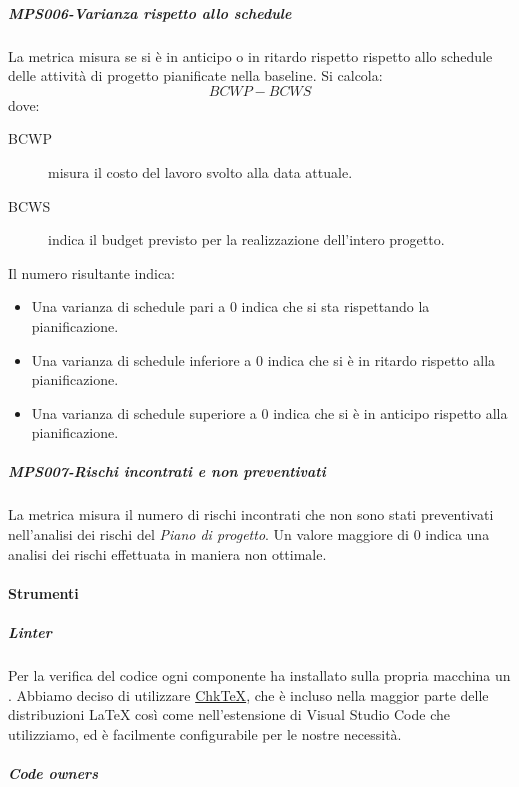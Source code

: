\documentclass[../norme-di-progetto.tex]{subfiles}
\begin{document}
\subparagraph{MPS006-Varianza rispetto allo schedule}%
\label{subp:MPS006-varianza_rispetto_allo_schedule}

La metrica misura se si è in anticipo o in ritardo rispetto rispetto allo schedule delle attività di progetto pianificate nella baseline. Si calcola:
\[
    BCWP - BCWS
\]
dove:
\begin{description}
  \item [BCWP] misura il costo del lavoro svolto alla data attuale.
  \item [BCWS] indica il budget previsto per la realizzazione dell'intero progetto.
\end{description}
Il numero risultante indica:
\begin{itemize}
  \item Una varianza di schedule pari a 0 indica che si sta rispettando la pianificazione.
  \item Una varianza di schedule inferiore a 0 indica che si è in ritardo rispetto alla pianificazione.
  \item Una varianza di schedule superiore a 0 indica che si è in anticipo rispetto alla pianificazione.
\end{itemize}

\subparagraph{MPS007-Rischi incontrati e non preventivati}%
\label{subp:MPS007-rischi_incontrati_e_non_preventivati}

La metrica misura il numero di rischi incontrati che non sono stati preventivati nell'analisi dei rischi del \textit{Piano di progetto}. Un valore maggiore di 0 indica una analisi dei rischi effettuata in maniera non ottimale.
\paragraph{Strumenti}%
\label{par:verifica/descrizione/strumenti}

\subparagraph{Linter}%
\label{subp:linter}

Per la verifica del codice ogni componente ha installato sulla propria macchina un .
Abbiamo deciso di utilizzare \href{https://www.nongnu.org/chktex/}{Chk\TeX}, che è incluso nella maggior parte delle distribuzioni \LaTeX{} così come nell'estensione di Visual Studio Code che utilizziamo, ed è facilmente configurabile per le nostre necessità.

\subparagraph{Code owners}%
\label{subp:code_owners}
\end{document}

